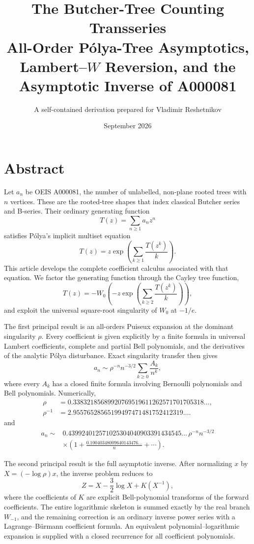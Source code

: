 \documentclass[11pt,a4paper,oneside,openany]{book}
\title{\Huge\bfseries The Butcher-Tree Counting Transseries\\[3mm]
\Large All-Order P\'olya-Tree Asymptotics,\\
Lambert--$W$ Reversion, and the Asymptotic Inverse of A000081}
\author{A self-contained derivation prepared for Vladimir Reshetnikov}
\date{September 2026}
\theoremstyle{definition}
\theoremstyle{remark}
\begin{document}
\frontmatter
\hypersetup{pageanchor=false}
\maketitle
\hypersetup{pageanchor=true}

\chapter*{Abstract}
Let $a_n$ be OEIS A000081, the number of unlabelled, non-plane rooted trees with
$n$ vertices.  These are the rooted-tree shapes that index classical Butcher
series and B-series.  Their ordinary generating function
\[
 T(z)=\sum_{n\ge1}a_nz^n
\]
satisfies P\'olya's implicit multiset equation
\[
 T(z)=z\exp\!\left(\sum_{k\ge1}\frac{T(z^k)}{k}\right).
\]
This article develops the complete coefficient calculus associated with that
equation.  We factor the generating function through the Cayley tree function,
\[
 T(z)=-W_0\!\left(-z\exp\!\left(\sum_{k\ge2}\frac{T(z^k)}{k}\right)\right),
\]
and exploit the universal square-root singularity of $W_0$ at $-1/e$.

The first principal result is an all-orders Puiseux expansion at the dominant
singularity $\rho$.  Every coefficient is given explicitly by a finite formula
in universal Lambert coefficients, complete and partial Bell polynomials, and
the derivatives of the analytic P\'olya disturbance.  Exact singularity
transfer then gives
\[
 a_n\sim \rho^{-n}n^{-3/2}\sum_{k\ge0}\frac{A_k}{n^k},
\]
where every $A_k$ has a closed finite formula involving Bernoulli polynomials
and Bell polynomials.  Numerically,
\begin{align*}
 \rho&=0.33832185689920769519611262571701705318\ldots,\\
 \rho^{-1}&=2.95576528565199497471481752412319\ldots .
\end{align*}
and
\begin{align*}
 a_n\sim{}&0.439924012571025304040903391434545\ldots\,
       \rho^{-n}n^{-3/2}\\
 &\times\left(1+\frac{0.10040348009640143476\ldots}{n}+\cdots\right).
\end{align*}

The second principal result is the full asymptotic inverse.  After normalizing
$x$ by $X=(-\log\rho)x$, the inverse problem reduces to
\[
 Z=X-\frac32\log X+K(X^{-1}),
\]
where the coefficients of $K$ are explicit Bell-polynomial transforms of the
forward coefficients.  The entire logarithmic skeleton is summed exactly by
the real branch $W_{-1}$, and the remaining correction is an ordinary inverse
power series with a Lagrange--B\"urmann coefficient formula.  An equivalent
polynomial--logarithmic expansion is supplied with a closed recurrence for all
coefficient polynomials.
\end{document}
